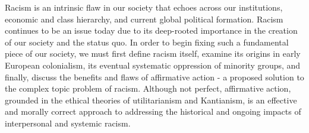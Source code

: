 \documentclass[12pt, a4paper, twoside]{article}
\begin{document}
\maketitle{}

Racism is an intrinsic flaw in our society that echoes across our institutions, economic and class hierarchy, and current global political formation. Racism continues to be an issue today due to its deep-rooted importance in the creation of our society and the status quo. In order to begin fixing such a fundamental piece of our society, we must first define racism itself, examine its origins in early European colonialism, its eventual systematic oppression of minority groups, and finally, discuss the benefits and flaws of affirmative action - a proposed solution to the complex topic problem of racism. Although not perfect, affirmative action, grounded in the ethical theories of utilitarianism and Kantianism, is an effective and morally correct approach to addressing the historical and ongoing impacts of interpersonal and systemic racism.
\end{document}
